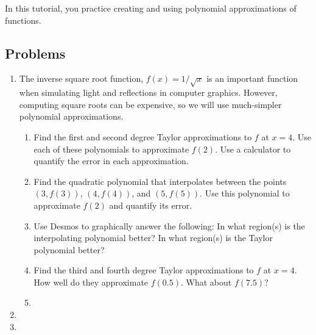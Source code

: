 		\begin{objectives}
			In this tutorial, you practice creating and using polynomial approximations of
			functions.
		\end{objectives}



		\subsection*{Problems}
		
		\begin{enumerate}
			\item  The inverse square root function, $f(x) = 1/\sqrt{x}$ is an important function
			when simulating light and reflections in computer graphics.  However, computing square 
			roots can be expensive, so we will use much-simpler polynomial approximations.
				\begin{enumerate}
					\item Find the first and second degree Taylor approximations to $f$ at $x=4$.
					Use each of these polynomials to approximate $f(2)$. Use a calculator 
					to quantify the error in each approximation.
					\item Find the quadratic polynomial that interpolates between the points 
					$(3,f(3))$, $(4,f(4))$, and $(5,f(5))$. 
					Use this polynomial to approximate $f(2)$ and quantify its error.

					\item Use Desmos to graphically answer the following: 
					In what region(s) is the interpolating polynomial better?
					In what region(s) is the Taylor polynomial better?

					\item Find the third and fourth degree Taylor approximations to $f$ at $x=4$.
					How well do they approximate $f(0.5)$. What about $f(7.5)$?

					\item %
				\end{enumerate}

				\item %

				\item %
		\end{enumerate}
